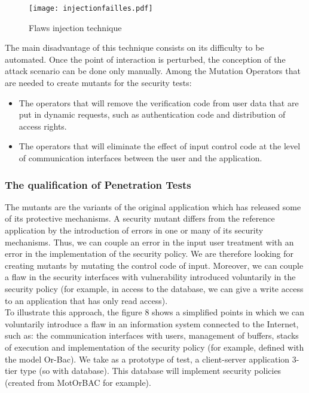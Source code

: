 \documentclass{acm_proc_article-sp}
\begin{document}
\newpage                                                                \begin{figure}[h!]                                                       \centering                                                               \texttt{[image: injectionfailles.pdf]}    \caption{Flaws injection technique}                                      \label{Flaws injection technique}                                        \end{figure}                                                             The main disadvantage of this technique consists on its difficulty to be automated. Once the point of interaction is perturbed, the conception of the attack scenario can be done only manually.
Among the Mutation Operators that are needed to create mutants for the security tests:
\begin{itemize}
\item The operators that will remove the verification code from user data that are put in dynamic requests, such as authentication code and distribution of access rights.
\item The operators that will eliminate the effect of input control code at the level of communication interfaces between the user and the application.
\end{itemize}

\subsubsection{The qualification of Penetration Tests}

The mutants are the variants of the original application which has released some of its protective mechanisms. A security mutant differs from the reference application by the introduction of errors in one or many of its security mechanisms. Thus, we can couple an error in the input user treatment with an error in the implementation of the security policy. We are therefore looking for creating mutants by mutating the control code of input. Moreover, we can couple a flaw in the security interfaces with vulnerability introduced voluntarily in the security policy (for example, in access to the database, we can give a write access to an application that has only read access).\\
To illustrate this approach, the figure 8 shows a simplified points in which we can voluntarily introduce a flaw in an information system connected to the Internet, such as: the communication interfaces with users, management of buffers, stacks of execution and implementation of the security policy (for example, defined with the model Or-Bac). We take as a prototype of test, a client-server application 3-tier type (so with database). This database will implement security policies (created from MotOrBAC for example).
\end{document}
